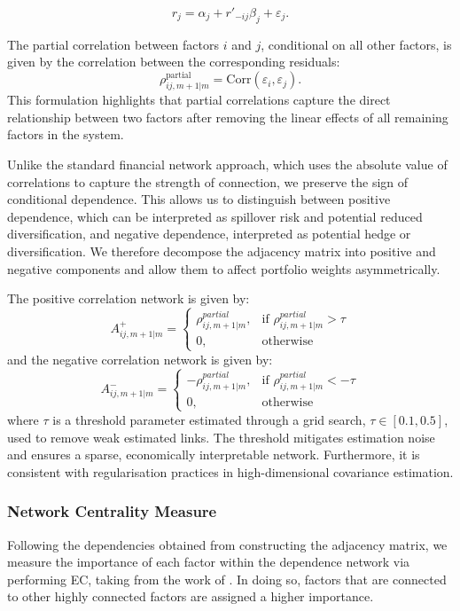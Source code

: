 \documentclass[11pt]{article}
\begin{document}
\begin{equation}
r_j = \alpha_j + r'_{-ij} \beta_j + \varepsilon_j.
\end{equation}

The partial correlation between factors $i$ and $j$, conditional on all other factors, is given by the correlation between the corresponding residuals:
\begin{equation}
\rho^{\text{partial}}_{ij,m+1|m}
=
\mathrm{Corr}(\varepsilon_i, \varepsilon_j).
\end{equation}
This formulation highlights that partial correlations capture the direct relationship between two factors after removing the linear effects of all remaining factors in the system. 

Unlike the standard financial network approach, which uses the absolute value of correlations to capture the strength of connection, we preserve the sign of conditional dependence. This allows us to distinguish between positive dependence, which can be interpreted as spillover risk and potential reduced diversification, and negative dependence, interpreted as potential hedge or diversification. We therefore decompose the adjacency matrix into positive and negative components and allow them to affect portfolio weights asymmetrically. 

The positive correlation network is given by:
\begin{equation}
A^{+}_{ij,m+1|m} =
\begin{cases}
\rho^{partial}_{ij,m+1|m}, & \text{if } \rho^{partial}_{ij,m+1|m} > \tau \\
0, & \text{otherwise}
\end{cases}
\end{equation}
and the negative correlation network is given by:
\begin{equation}
A^{-}_{ij,m+1|m} =
\begin{cases}
-\rho^{partial}_{ij,m+1|m}, & \text{if } \rho^{partial}_{ij,m+1|m} < -\tau \\
0, & \text{otherwise}
\end{cases}
\end{equation}
where $\tau$ is a threshold parameter estimated through a grid search, $\tau \in [0.1, 0.5]$, used to remove weak estimated links. The threshold mitigates estimation noise and ensures a sparse, economically interpretable network. Furthermore, it is consistent with regularisation practices in high-dimensional covariance estimation.

\subsubsection{Network Centrality Measure}
Following the dependencies obtained from constructing the adjacency matrix, we measure the importance of each factor within the dependence network via performing EC, taking from the work of \cite{peralta2016network, MisirliScidaVelikov2025}. In doing so, factors that are connected to other highly connected factors are assigned a higher importance. 
\end{document}
